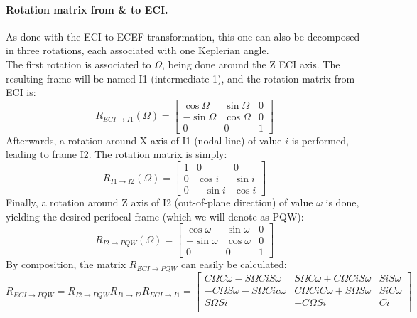 			\paragraph{Rotation matrix from \& to ECI. \\}
			\indent As done with the ECI to ECEF transformation, this one can also be decomposed in three rotations, each associated with one Keplerian angle.\\
			\indent The first rotation is associated to $\Omega$, being done around the Z ECI axis. The resulting frame will be named I1 (intermediate 1), and the rotation matrix from ECI is:
			\[
			R_{ECI\rightarrow I1}(\Omega) = \left[
			\begin{array}{ccc}
			\cos \Omega 	& \sin \Omega 	& 0 \\
			- \sin \Omega 	& \cos \Omega 	& 0 \\
			0 				& 0 			& 1 
			\end{array}						
			\right]	
			\]
			\indent Afterwards, a rotation around X axis of I1 (nodal line) of value $i$ is performed, leading to frame I2. The rotation matrix is simply:
			\[
			R_{I1\rightarrow I2}(\Omega) = \left[
			\begin{array}{ccc}
			1 	& 0			 	& 0 \\
			0 	& \cos i 		& \sin i \\
			0 	& -\sin i		& \cos i 
			\end{array}						
			\right]	
			\]
			\indent Finally, a rotation around Z axis of I2 (out-of-plane direction) of value $\omega$ is done, yielding the desired perifocal frame (which we will denote as PQW):
			\[
			R_{I2\rightarrow PQW}(\Omega) = \left[
			\begin{array}{ccc}
			\cos \omega 	& \sin \omega 	& 0 \\
			- \sin \omega 	& \cos \omega 	& 0 \\
			0 				& 0 			& 1 
			\end{array}						
			\right]	
			\]
			\indent By composition, the matrix $R_{ECI\rightarrow PQW}$ can easily be calculated:
			\[
			R_{ECI \rightarrow PQW} = R_{I2 \rightarrow PQW}R_{I1 \rightarrow I2} R_{ECI \rightarrow I1} = 
			\left[\begin{array}{ccc}
			C \Omega C \omega - S \Omega Ci S\omega 	& S\Omega C\omega + C\Omega Ci S\omega 	& Si S\omega \\
			-C \Omega S \omega - S \Omega Ci c\omega 	& C\Omega Ci C\omega + S\Omega S\omega 	& Si C\omega \\
			S \Omega Si									& - C\Omega Si  						& Ci \\
			\end{array}\right]
			\]
